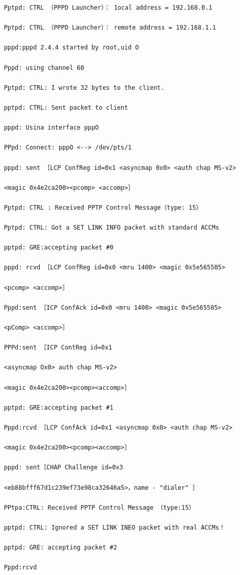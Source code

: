 \begin{verbatim}
    Pptpd: CTRL （PPPD Launcher）： 1ocal address = 192.168.0.1
    
    Pptpd: CTRL （PPPD Launcher）： remote address = 192.168.1.1
    
    pppd:pppd 2.4.4 started by root,uid O
    
    Pppd: using channel 60
    
    Pptpd: CTRL: I wrote 32 bytes to the client.
    
    pptpd: CTRL: Sent packet to client
    
    pppd: Usina interface pppO
    
    PPpd: Connect: pppO <--> /dev/pts/1
    
    pppd: sent ［LCP ConfReg id=0x1 <asyncmap 0x0> <auth chap MS-v2>
    
    <magic 0x4e2ca200><pcomp> <accomp>］
    
    Pptpd: CTRL : Received PPTP Control Message（type: 15）
    
    Pptpd: CTRL: Got a SET LINK INFO packet with standard ACCMs
    
    pptpd: GRE:accepting packet #0
    
    pppd: rcvd ［LCP ConfReg id=0x0 <mru 1400> <magic 0x5e565505>
    
    <pcomp> <accomp>］
    
    Pppd:sent ［ICP ConfAck id=0x0 <mru 1400> <magic 0x5e565505>
    
    <pComp> <accomp>］
    
    PPPd:sent ［ICP ContReg id=0x1
    
    <asyncmap Ox0> auth chap MS-v2>
    
    <magic 0x4e2ca200><pcomp><accomp>］
    
    pptpd: GRE:accepting packet #1
    
    Pppd:rcvd ［LCP ConfAck id=0x1 <asyncmap 0x0> <auth chap MS-v2>
    
    <magic 0x4e2ca200><pcomp><accomp>］
    
    pppd: sent［CHAP Challenge id=0x3
    
    <eb88bfff67d1c239ef73e98ca32646a5>，name - "dialer" ］
    
    PPtpa:CTRL: Received PPTP Control Message （type:15）
    
    pptpd: CTRL: Ignored a SET LINK INEO packet with real ACCMs！
    
    pptpd: GRE: accepting packet #2
    
    Pppd:rcvd
    

\end{verbatim}

